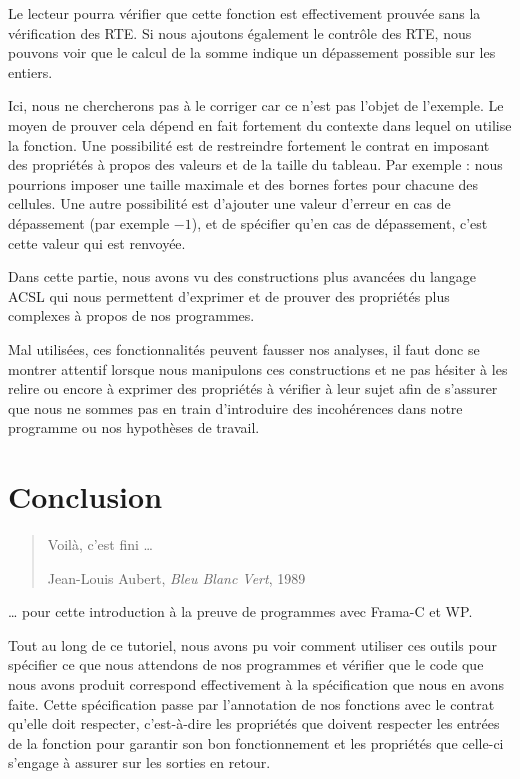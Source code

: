 \documentclass[12pt,francais,]{scrbook}
\begin{document}
Le lecteur pourra vérifier que cette fonction est effectivement prouvée
sans la vérification des RTE. Si nous ajoutons également le contrôle des
RTE, nous pouvons voir que le calcul de la somme indique un dépassement
possible sur les entiers.

Ici, nous ne chercherons pas à le corriger car ce n'est pas l'objet de
l'exemple. Le moyen de prouver cela dépend en fait fortement du contexte
dans lequel on utilise la fonction. Une possibilité est de restreindre
fortement le contrat en imposant des propriétés à propos des valeurs et
de la taille du tableau. Par exemple : nous pourrions imposer une taille
maximale et des bornes fortes pour chacune des cellules. Une autre
possibilité est d'ajouter une valeur d'erreur en cas de dépassement (par
exemple \(-1\)), et de spécifier qu'en cas de dépassement, c'est cette
valeur qui est renvoyée.

Dans cette partie, nous avons vu des constructions plus avancées du
langage ACSL qui nous permettent d'exprimer et de prouver des propriétés
plus complexes à propos de nos programmes.

Mal utilisées, ces fonctionnalités peuvent fausser nos analyses, il faut
donc se montrer attentif lorsque nous manipulons ces constructions et ne
pas hésiter à les relire ou encore à exprimer des propriétés à vérifier
à leur sujet afin de s'assurer que nous ne sommes pas en train
d'introduire des incohérences dans notre programme ou nos hypothèses de
travail.

\chapter{Conclusion}\label{conclusion}

\begin{quote}
  Voilà, c'est fini \ldots{}

  Jean-Louis Aubert, \emph{Bleu Blanc Vert}, 1989
\end{quote}

\ldots{} pour cette introduction à la preuve de programmes avec Frama-C
et WP.

Tout au long de ce tutoriel, nous avons pu voir comment utiliser ces
outils pour spécifier ce que nous attendons de nos programmes et
vérifier que le code que nous avons produit correspond effectivement à
la spécification que nous en avons faite. Cette spécification passe par
l'annotation de nos fonctions avec le contrat qu'elle doit respecter,
c'est-à-dire les propriétés que doivent respecter les entrées de la
fonction pour garantir son bon fonctionnement et les propriétés que
celle-ci s'engage à assurer sur les sorties en retour.
\end{document}
